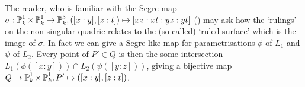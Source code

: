 \begin{remark}
The reader, who is familiar with the Segre map $\sigma : \operatorname{\mathbb P}^1_k \times \operatorname{\mathbb P}^1_k \to \operatorname{\mathbb P}^3_k, ([x:y],[z:t]) \mapsto [xz:xt:yz:yt]$ (\cite[example 2.11]{harris1992algebraic}) may ask how the `rulings' on the non-singular quadric relates to the (so called) `ruled surface' which is the image of $\sigma$.
In fact we can give a Segre-like map for parametrisations $\phi$ of $L_1$ and $\psi$ of $L_2$.
Every point of $P' \in Q$ is then the some intersection $L_1(\phi([x:y])) \cap L_2(\psi([y:z]))$, giving a bijective map $Q \to \operatorname{\mathbb P}^1_k \times \operatorname{\mathbb P}^1_k, P' \mapsto ([x:y],[z:t])$.
\end{remark}
